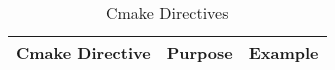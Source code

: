 \begin{table}[]
\centering
\caption{Cmake Directives}
\label{CDirec}
\begin{tabular}{lll}
\hline
\multicolumn{1}{|l|}{\textbf{Cmake Directive}} & \multicolumn{1}{l|}{\textbf{Purpose}}                                                                                                                                                                                                          & \multicolumn{1}{l|}{\textbf{Example}}                                                                                                                                                                                                                                                                                                                                                                                                                                                                                                                                                                                                                                                                                                                                                                              \\ \hline

\end{tabular}
\end{table}
